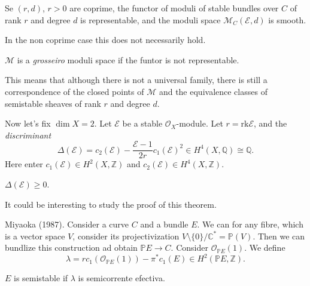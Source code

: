 \documentclass{book}
\begin{document}
\begin{example}
\label{example-hilbert-polynomial-sheaf}
\end{example}

\begin{theorem}
\label{theorem-moduli-suave}
Se $(r,d)$, $r>0$ are coprime,
the functor of moduli of stable bundles
over $C$ of rank $r$ and degree $d$
is representable, and the moduli space
$\mathcal{M}_C(\mathcal{E},d)$ is smooth.
\end{theorem}

\noindent
In the non coprime case this does not
necessarily hold.

\begin{definition}
\label{definition-}
$\mathcal{M}$ is a {\it grosseiro} moduli
space
if the funtor is not representable.
\end{definition}

\noindent
This means that although there is not
a universal family,
there is still a correspondence
of the closed points of $\mathcal{M}$ and the
equivalence classes of semistable sheaves
of rank $r$ and degree $d$.

\medskip\noindent
Now let's fix $\dim X=2$.
Let $\mathcal{E}$ be a stable
$\mathcal{O}_X$-module.
Let $r=\text{rk}\mathcal{E}$,
and the {\it discriminant}
$$
\Delta(\mathcal{E})=c_2(\mathcal{E})-
\frac{\mathcal{E}-1}{2r}c_1(\mathcal{E})^2
\in H^4(X,\mathbb{Q})\cong\mathbb{Q}.
$$
Here enter $c_1(\mathcal{E}) \in
H^2(X,\mathbb{Z})$
and $c_2(\mathcal{E}) \in H^4(X,\mathbb{Z})$.

\begin{theorem}[Bogomolov]
\label{theorem-bogomolov}
$\Delta(\mathcal{E}) \geq 0$.
\end{theorem}

\noindent
It could be interesting to study the proof of
this theorem.

\medskip\noindent
Miyaoka (1987). Consider a curve $C$ and a
bundle $E$.
We can for any fibre, which is a vector space
$V$,
consider its projectivization
$V\setminus\{0\}/\mathbb{C}^*=\mathbb{P}(V)$.
Then we can bundlize this construction ad
obtain
$\mathbb{P}E \to C$.
Consider $\mathcal{O}_{\mathbb{P}E}(1)$.
We define
$$
\lambda=rc_1(\mathcal{O}_{\mathbb{P}E}(1))
-\pi^*c_1(E) \in H^2(\mathbb{P}E,\mathbb{Z}).
$$

\begin{theorem}
\label{theorem-semistable-nef}
$E$ is semistable if $\lambda$ is
semicorrente efectiva.
\end{theorem}
\end{document}
